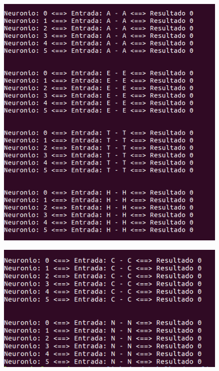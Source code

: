 \documentclass[hidelinks,12pt]{article}
\begin{document}
		\begin{figure}[!h]
			\centering
			\includegraphics[scale=0.5]{Figures/E3SLP1R.png}
		\end{figure}
		
		\begin{figure}[!h]
			\centering
			\includegraphics[scale=0.5]{Figures/E3SLP2R.png}
		\end{figure}
		
	
\end{document}

